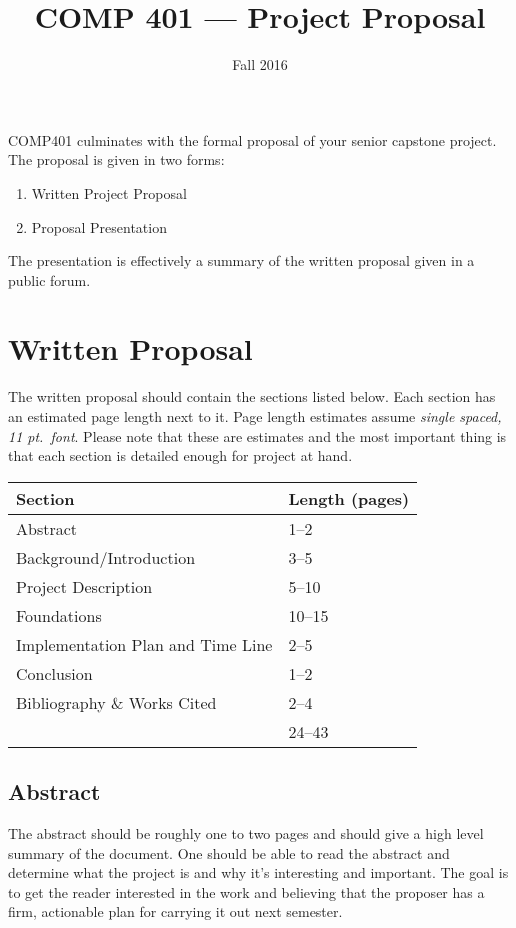\documentclass[10pt]{article}
\title{COMP 401 --- Project Proposal}
\author{  }
\date{Fall 2016}
\begin{document}
\maketitle

COMP401 culminates with the formal proposal of your senior capstone project.  The proposal is given in two forms:
\begin{enumerate}
\item Written Project Proposal
\item Proposal Presentation
\end{enumerate}
The presentation is effectively a summary of the written proposal given in a public forum.

\section{Written Proposal}

The written proposal should contain the sections listed below.  Each section has an estimated page length next to it.  Page length estimates assume \textit{single spaced, 11 pt.\ font}.  Please note that these are estimates and the most important thing is that each section is detailed enough for project at hand.
\begin{center}
\begin{tabular}{ll}
  Section & Length (pages) \\ \toprule
  Abstract & 1--2 \\
  Background/Introduction  & 3--5 \\
  Project Description  & 5--10 \\
  Foundations & 10--15 \\
  Implementation Plan and Time Line & 2--5 \\
  Conclusion & 1--2 \\
  Bibliography \& Works Cited & 2--4 \\ \midrule
   & 24--43
\end{tabular}
\end{center}

\subsection{Abstract}

The abstract should be roughly one to two pages and should give a high level summary of the document.  One should be able to read the abstract and determine what the project is and why it's interesting and important.  The goal is to get the reader interested in the work and believing that the proposer has a firm, actionable plan for carrying it out next semester.
\end{document}
